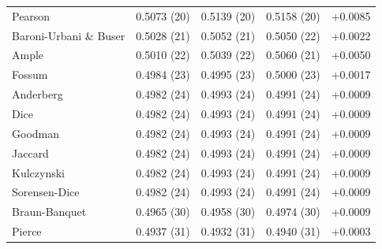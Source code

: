 \begin{table}[t]
{\begin{tabular}{lrrrr}
Pearson & 0.5073 (20) & 0.5139 (20) & 0.5158 (20) & +0.0085 \\
Baroni-Urbani \& Buser & 0.5028 (21) & 0.5052 (21) & 0.5050 (22) & +0.0022 \\
Ample & 0.5010 (22) & 0.5039 (22) & 0.5060 (21) & +0.0050 \\
Fossum & 0.4984 (23) & 0.4995 (23) & 0.5000 (23) & +0.0017 \\
Anderberg & 0.4982 (24) & 0.4993 (24) & 0.4991 (24) & +0.0009 \\
Dice & 0.4982 (24) & 0.4993 (24) & 0.4991 (24) & +0.0009 \\
Goodman & 0.4982 (24) & 0.4993 (24) & 0.4991 (24) & +0.0009 \\
Jaccard & 0.4982 (24) & 0.4993 (24) & 0.4991 (24) & +0.0009 \\
Kulczynski & 0.4982 (24) & 0.4993 (24) & 0.4991 (24) & +0.0009 \\
Sorensen-Dice & 0.4982 (24) & 0.4993 (24) & 0.4991 (24) & +0.0009 \\
Braun-Banquet & 0.4965 (30) & 0.4958 (30) & 0.4974 (30) & +0.0009 \\
Pierce & 0.4937 (31) & 0.4932 (31) & 0.4940 (31) & +0.0003 \\
\bottomrule
\end{tabular}
}
\end{table}
